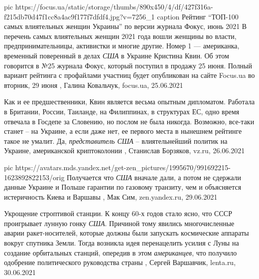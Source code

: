 \ifcmt
  pic https://focus.ua/static/storage/thumbs/890x450/4/df/427f316a-f215db70d47f1cc8a4ac9f177f7dfdf4.jpg?v=7256_1
	caption Рейтинг \enquote{ТОП-100 самых влиятельных женщин Украины} по версии журнала Фокус, июнь 2021
\fi
В перечень самых влиятельных женщин 2021 года вошли женщины во власти,
предпринимательницы, активистки и многие другие. Номер 1 — американка,
временный поверенный в делах \emph{США} в Украине Кристина Квин.  Об этом
говорится в №25 журнала Фокус, который поступил в продажу 25 июня. Полный
вариант рейтинга с профайлами участниц будет опубликован на сайте Focus.ua во
вторник, 29 июня
, 
Галина Ковальчук, focus.ua, 25.06.2021

Как и ее предшественники, Квин является весьма опытным дипломатом. Работала в
Британии, России, Таиланде, на Филиппинах, в структурах ЕС, одно время отвечала
в Госдепе за Словению, но послом не была никогда. Возможно, все-таки станет –­
на Украине, а если даже нет, ее первого места в нынешнем рейтинге такое не
умалит. Да, \emph{представитель США} – влиятельнейший политик на Украине, американской
криптоколонии
, 
Станислав Борзяков, vz.ru, 26.06.2021

\ifcmt
  pic https://avatars.mds.yandex.net/get-zen_pictures/1995670/991692215-1623892822153/orig
\fi
Получается что \emph{США} вначале дали, а потом не сдержали данные Украине и
Польше гарантии по газовому транзиту, чем и объясняется истеричность Киева и
Варшавы
, 
Мак Сим, zen.yandex.ru, 29.06.2021

Укрощение строптивой станции.  К концу 60-х годов стало ясно, что СССР
проигрывает лунную гонку \emph{США}. Причиной тому явились многочисленные аварии
ракет-носителей, которые должны были запускать космические аппараты вокруг
спутника Земли. Тогда возникла идея перенацелить усилия с Луны на создание
орбитальных станций, опередив в этом \emph{американцев}, что получило одобрение
политического руководства страны
, Сергей Варшавчик, lenta.ru, 30.06.2021

